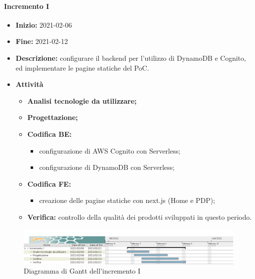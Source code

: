 \paragraph[Incremento I]{Incremento I}
\begin{itemize}
    \item [] \textbf{Inizio:} 2021-02-06
    \item [] \textbf{Fine:} 2021-02-12
    \item [] \textbf{Descrizione:} configurare il backend per l'utilizzo di DynamoDB e Cognito, ed implementare le pagine statiche del PoC.
    \item [] \textbf{Attività}
          \begin{itemize}
              \item \textbf{Analisi tecnologie da utilizzare;}
              \item \textbf{Progettazione;}
              \item \textbf{Codifica BE:}
                    \begin{itemize}
                        \item configurazione di AWS Cognito con Serverless;
                        \item configurazione di DynamoDB con Serverless;
                    \end{itemize}
              \item \textbf{Codifica FE:}
                    \begin{itemize}
                        \item creazione delle pagine statiche con next.js (Home e PDP);
                    \end{itemize}
              \item \textbf{Verifica:} controllo della qualità dei prodotti sviluppati in questo periodo.
          \end{itemize}
    
\end{itemize}

\begin{figure}[H]
    \centering
    \includegraphics[width=1\linewidth]{res/images/pianificazione/incremento_1.png}
    \caption{Diagramma di Gantt dell'incremento I}
    \label{fig:_Gantt incremento I}
\end{figure}

